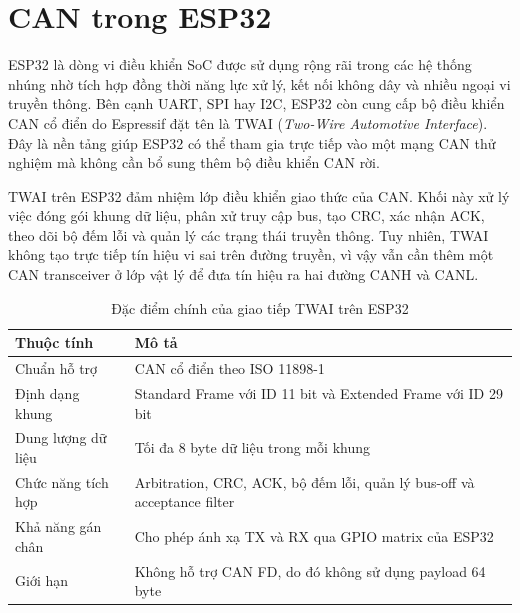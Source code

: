 \chapter{CAN trong ESP32}


ESP32 là dòng vi điều khiển SoC được sử dụng rộng rãi trong các hệ thống nhúng nhờ tích
hợp đồng thời năng lực xử lý, kết nối không dây và nhiều ngoại vi truyền thông. Bên
cạnh UART, SPI hay I2C, ESP32 còn cung cấp bộ điều khiển CAN cổ điển do Espressif đặt
tên là TWAI (\textit{Two-Wire Automotive Interface}). Đây là nền tảng giúp ESP32 có thể
tham gia trực tiếp vào một mạng CAN thử nghiệm mà không cần bổ sung thêm bộ điều
khiển CAN rời.


TWAI trên ESP32 đảm nhiệm lớp điều khiển giao thức của CAN. Khối này xử lý việc đóng
gói khung dữ liệu, phân xử truy cập bus, tạo CRC, xác nhận ACK, theo dõi bộ đếm lỗi và
quản lý các trạng thái truyền thông. Tuy nhiên, TWAI không tạo trực tiếp tín hiệu vi sai
trên đường truyền, vì vậy vẫn cần thêm một CAN transceiver ở lớp vật lý để đưa tín hiệu
ra hai đường CANH và CANL.

\begin{table}[H]
\centering
\begin{tabular}{|p{4.2cm}|p{9.2cm}|}
\hline
\textbf{Thuộc tính} & \textbf{Mô tả} \\ \hline
Chuẩn hỗ trợ & CAN cổ điển theo ISO 11898-1 \\ \hline
Định dạng khung & Standard Frame với ID 11 bit và Extended Frame với ID 29 bit \\ \hline
Dung lượng dữ liệu & Tối đa 8 byte dữ liệu trong mỗi khung \\ \hline
Chức năng tích hợp & Arbitration, CRC, ACK, bộ đếm lỗi, quản lý bus-off và acceptance filter \\ \hline
Khả năng gán chân & Cho phép ánh xạ TX và RX qua GPIO matrix của ESP32 \\ \hline
Giới hạn & Không hỗ trợ CAN FD, do đó không sử dụng payload 64 byte \\ \hline
\end{tabular}
\caption{Đặc điểm chính của giao tiếp TWAI trên ESP32}
\end{table}




